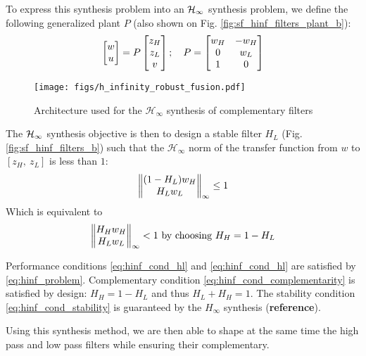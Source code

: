 \documentclass[9pt, technote, a4paper]{ieeeconf}
\begin{document}
To express this synthesis problem into an \(\mathcal{H}_\infty\) synthesis problem, we define the following generalized plant \(P\) (also shown on Fig. \ref{fig:sf_hinf_filters_plant_b}):
\begin{equation}
\label{eq:generalized_plant}
  \begin{bmatrix}w\\u\end{bmatrix} = P \begin{bmatrix}z_H \\ z_L \\ v\end{bmatrix}; \quad P = \begin{bmatrix} w_H & -w_H \\ 0 & w_L \\ 1 & 0 \end{bmatrix}
\end{equation}

\begin{figure}[htbp]
\centering
\texttt{[image: figs/h\_infinity\_robust\_fusion.pdf]}
\caption{\label{fig:h_infinity_robust_fusion}
Architecture used for the \(\mathcal{H}_\infty\) synthesis of complementary filters}
\end{figure}

The \(\mathcal{H}_\infty\) synthesis objective is then to design a stable filter \(H_L\) (Fig. \ref{fig:sf_hinf_filters_b}) such that the \(\mathcal{H}_\infty\) norm of the transfer function from \(w\) to \([z_H, \ z_L]\) is less than \(1\):
\begin{equation}
  \left\|\begin{matrix} (1 - H_L) w_H \\ H_L w_L \end{matrix}\right\|_{\infty} \le 1
\end{equation}
Which is equivalent to
\begin{equation}
\label{eq:hinf_problem}
  \left\|\begin{matrix} H_H w_H \\ H_L w_L \end{matrix}\right\|_{\infty} < 1 \text{ by choosing } H_H = 1 - H_L
\end{equation}

Performance conditions \eqref{eq:hinf_cond_hl} and \eqref{eq:hinf_cond_hl} are satisfied by \eqref{eq:hinf_problem}.
Complementary condition \eqref{eq:hinf_cond_complementarity} is satisfied by design: \(H_H = 1 - H_L\) and thus \(H_L + H_H = 1\).
The stability condition \eqref{eq:hinf_cond_stability} is guaranteed by the \(H_\infty\) synthesis (\textbf{reference}).


Using this synthesis method, we are then able to shape at the same time the high pass and low pass filters while ensuring their complementary.
\end{document}
